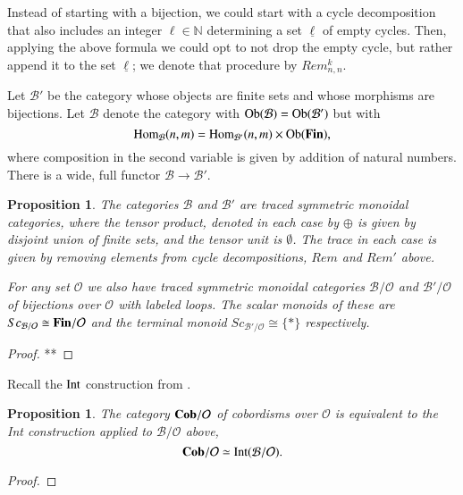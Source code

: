 \documentclass{amsart}
\def\tn{\textnormal}
\def\mc{\mathcal}
\def\NN{{\mathbb N}}
\def\Hom{\tn{Hom}}
\def\Ob{\tn{Ob}}
\def\singleton{{\{*\}}}
\def\to{\rightarrow}
\def\iso{\cong}
\def\ul{\underline}
\def\Cob{{\bf Cob}}
\def\mcB{\mc{B}}
\def\mcO{\mc{O}}
\def\Fin{{\bf Fin}}
\def\Int{\tn{Int}}
\newtheorem{proposition}[subsubsection]{Proposition}
\theoremstyle{remark}
\theoremstyle{definition}
\begin{document}
Instead of starting with a bijection, we could start with a cycle decomposition that also includes an integer $\ell\in\NN$ determining a set $\ul\ell$ of empty cycles. Then, applying the above formula we could opt to not drop the empty cycle, but rather append it to the set $\ul\ell$; we denote that procedure by $Rem^k_{n,n}$.

Let $\mcB'$ be the category whose objects are finite sets and whose morphisms are bijections. Let $\mcB$ denote the category with $\Ob(\mcB)=\Ob(\mcB')$ but with 
$$\Hom_{\mcB}(n,m)=\Hom_{\mcB'}(n,m)\times\Ob(\Fin),$$
where composition in the second variable is given by addition of natural numbers. There is a wide, full functor $\mcB\to\mcB'$.

\begin{proposition}

The categories $\mcB$ and $\mcB'$ are traced symmetric monoidal categories, where the tensor product, denoted in each case by $\oplus$ is given by disjoint union of finite sets, and the tensor unit is $\emptyset$. The trace in each case is given by removing elements from cycle decompositions, $Rem$ and $Rem'$ above.

For any set $\mcO$ we also have traced symmetric monoidal categories $\mcB/\mcO$ and $\mcB'/\mcO$ of bijections over $\mcO$ with labeled loops. The scalar monoids of these are $Sc_{\mcB/\mcO}\iso\Fin/\mcO$ and the terminal monoid $Sc_{\mcB'/\mcO}\iso\singleton$ respectively. 

\end{proposition}

\begin{proof}

**

\end{proof}

Recall the $\Int$ construction from \cite{JoyalStreetVerity}.

\begin{proposition}

The category $\Cob/\mcO$ of cobordisms over $\mcO$ is equivalent to the Int construction applied to $\mcB/\mcO$ above,
$$\Cob/\mcO\simeq\Int(\mcB/\mcO).$$

\end{proposition}

\begin{proof}



\end{proof}
\end{document}
